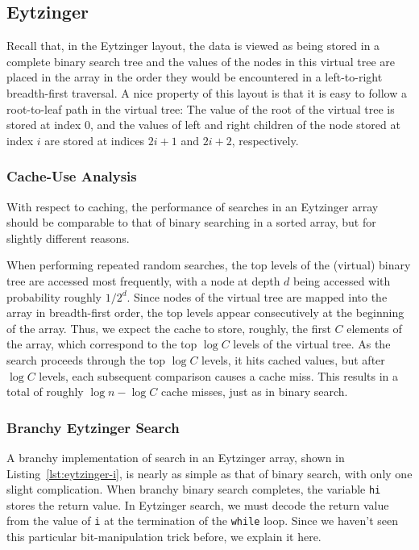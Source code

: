 \documentclass{patmorin}
\newcommand{\lstref}[1]{Listing~\ref{lst:#1}}
\begin{document}
\subsection{Eytzinger}

Recall that, in the Eytzinger layout, the data is viewed as being
stored in a complete binary search tree and the values of the nodes in
this virtual tree are placed in the array in the order they would be
encountered in a left-to-right breadth-first traversal.  A nice property
of this layout is that it is easy to follow a root-to-leaf path in the
virtual tree: The value of the root of the virtual tree is stored at
index 0, and the values of left and right children of the node stored
at index $i$ are stored at indices $2i+1$ and $2i+2$, respectively.


\subsubsection{Cache-Use Analysis}

With respect to caching, the performance of searches in an Eytzinger
array should be comparable to that of binary searching in a sorted array,
but for slightly different reasons.

When performing repeated random searches, the top levels of the (virtual)
binary tree are accessed most frequently, with a node at depth $d$
being accessed with probability roughly $1/2^d$.  Since nodes of the
virtual tree are mapped into the array in breadth-first order, the
top levels appear consecutively at the beginning of the array. Thus,
we expect the cache to store, roughly, the first $C$ elements of the
array, which correspond to the top $\log C$ levels of the virtual tree.
As the search proceeds through the top $\log C$ levels, it hits cached
values, but after $\log C$ levels, each subsequent comparison causes
a cache miss.  This results in a total of roughly $\log n-\log C$ cache
misses, just as in binary search.



\subsubsection{Branchy Eytzinger Search}

A branchy implementation of search in an Eytzinger array, shown in
\lstref{eytzinger-i}, is nearly as simple as that of binary search, with
only one slight complication. When branchy binary search completes, the
variable \texttt{hi} stores the return value. In Eytzinger search,
we must decode the return value from the value of \texttt{i}
at the termination of the \texttt{while} loop.  Since we haven't seen
this particular bit-manipulation trick before, we explain it here.
\end{document}
